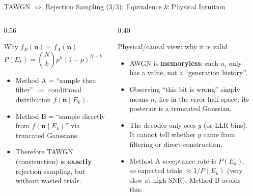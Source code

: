 \begin{frame}{TAWGN $\Leftrightarrow$ Rejection Sampling (3/3): Equivalence \& Physical Intuition}
\vspace{-0.15cm}
\begin{columns}
  \begin{column}{0.56\textwidth}
    \begin{block}{Why $f_B(\bm{n})=f_A(\bm{n})$}
    \vspace{-0.15cm}
    \[
    P(E_k)=\binom{N}{k}p^k(1-p)^{N-k}\quad\Rightarrow\quad
    f_B(\bm{n})=\frac{f(\bm{n})\,\mathbf{1}\{\bm{n}\in E_k\}}{P(E_k)}=f(\bm{n}\mid E_k).
    \]
    \vspace{-0.1cm}
    \begin{itemize}
      \item Method A = ``sample then filter'' $\Rightarrow$ conditional distribution $f(\bm{n}\mid E_k)$.
      \item Method B = ``sample directly from $f(\bm{n}\mid E_k)$'' via truncated Gaussians.
      \item Therefore TAWGN (construction) is \textbf{exactly} rejection sampling, but without wasted trials.
    \end{itemize}
    \end{block}
  \end{column}
  \begin{column}{0.40\textwidth}
    \begin{block}{Physical/causal view: why it is valid}
    \vspace{-0.1cm}
    \begin{itemize}
      \item AWGN is \textbf{memoryless}: each $n_i$ only has a value, not a ``generation history''.
      \item Observing ``this bit is wrong'' simply means $n_i$ lies in the error half-space; its posterior is a truncated Gaussian.
      \item The decoder only sees $y$ (or LLR bins). It cannot tell whether $y$ came from filtering or direct construction.
      \item Method A acceptance rate is $P(E_k)$, so expected trials $\approx 1/P(E_k)$ (very slow at high SNR); Method B avoids this.
    \end{itemize}
    \end{block}
  \end{column}
\end{columns}
\end{frame}

